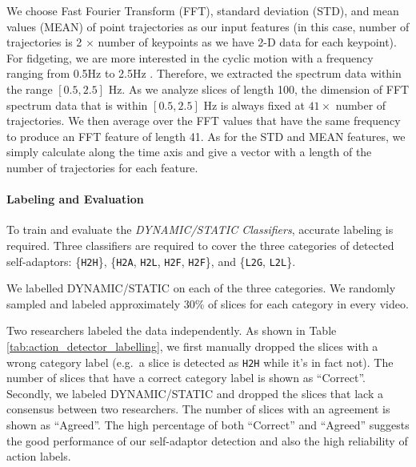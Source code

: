 We choose Fast Fourier Transform (FFT), standard deviation (STD), and mean values (MEAN) of point trajectories as our input features (in this case, number of trajectories is 2 $\times$ number of keypoints as we have 2-D data for each keypoint). 
For fidgeting, we are more interested in the cyclic motion with a frequency ranging from 0.5Hz to 2.5Hz \cite{mahmoud2013automatic}. Therefore, we extracted the spectrum data within the range $[0.5, 2.5]$ Hz.
As we analyze slices of length 100, the dimension of FFT spectrum data that is within $[0.5, 2.5]$ Hz is always fixed at $41 \times$ number of trajectories. 
We then average over the FFT values that have the same frequency to produce an FFT feature of length 41. As for the STD and MEAN features, we simply calculate along the time axis and give a vector with a length of the number of trajectories for each feature.


\paragraph{Labeling and Evaluation}
To train and evaluate the \textit{DYNAMIC/STATIC Classifiers}, accurate labeling is required. Three classifiers are required to cover the three categories of detected self-adaptors: \{\texttt{H2H}\}, \{\texttt{H2A}, \texttt{H2L}, \texttt{H2F}, \texttt{H2F}\}, and \{\texttt{L2G}, \texttt{L2L}\}.

We labelled DYNAMIC/STATIC on each of the three categories. We randomly sampled and labeled approximately 30\% of slices for each category in every video. 

Two researchers labeled the data independently. As shown in Table \ref{tab:action_detector_labelling}, we first manually dropped the slices with a wrong category label (e.g.\ a slice is detected as \texttt{H2H} while it's in fact not). The number of slices that have a correct category label is shown as ``Correct''. Secondly, we labeled DYNAMIC/STATIC and dropped the slices that lack a consensus between two researchers. The number of slices with an agreement is shown as ``Agreed''. The high percentage of both ``Correct'' and ``Agreed'' suggests the good performance of our self-adaptor detection and also the high reliability of action labels.









